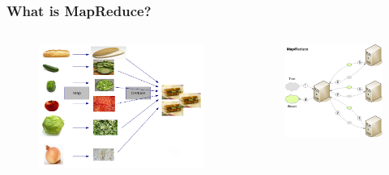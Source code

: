 \documentclass{beamer}
\begin{document}
\begin{frame}
\frametitle{What is MapReduce?}
\begin{columns}[c]
\begin{figure}[htpb]
  \begin{center}
	\includegraphics[width=\linewidth]{mapreduce1.png}
  \end{center}
\end{figure}

\begin{figure}[htpb]
  \begin{center}
	\includegraphics[width=\linewidth]{mapreduce2.png}
  \end{center}
\end{figure}
\end{columns}
\end{frame}
\end{document}

